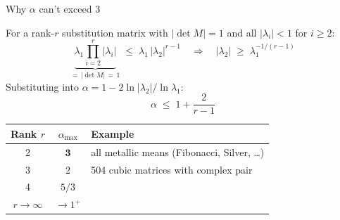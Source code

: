 \documentclass[aspectratio=169, 11pt]{beamer}
\begin{document}
\begin{frame}{Why $\alpha$ can't exceed 3}

For a rank-$r$ substitution matrix with $|\det M|=1$ and all $|\lambda_i|<1$ for $i\geq 2$:
\[
  \underbrace{\lambda_1\prod_{i=2}^{r}|\lambda_i|}_{=\,|\det M|\,=\,1}
  \;\leq\; \lambda_1\,|\lambda_2|^{r-1}
  \quad\Rightarrow\quad
  |\lambda_2| \;\geq\; \lambda_1^{-1/(r-1)}
\]
Substituting into $\alpha = 1 - 2\ln|\lambda_2|/\ln\lambda_1$:
\[
  \boxed{\;\alpha \;\leq\; 1 + \frac{2}{r-1}\;}
\]

\medskip
\centering
\begin{tabular}{ccl}
\toprule
Rank $r$ & $\alpha_{\max}$ & Example \\
\midrule
2 & $\mathbf{3}$ & all metallic means (Fibonacci, Silver, \ldots) \\
3 & 2 & 504 cubic matrices with complex pair \\
4 & $5/3$ & \\
$r\to\infty$ & $\to 1^+$ & \\
\bottomrule
\end{tabular}

\end{frame}
\end{document}
